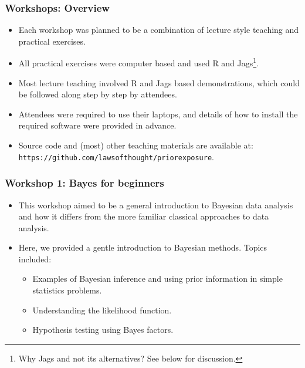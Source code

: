 \begin{frame}
	\frametitle{Workshops: Overview}

	\begin{itemize}
		\item Each workshop was planned to be a combination of lecture style teaching and practical exercises.
		\item All practical exercises were computer based and used R and Jags\footnote{Why Jags and not its alternatives? See below for discussion.}.
		\item Most lecture teaching involved R and Jags based demonstrations, which could be followed along step by step by attendees.
		\item Attendees were required to use their laptops, and details of how to install the required software were provided in advance.
		\item Source code and (most) other teaching materials are available at: \texttt{https://github.com/lawsofthought/priorexposure}.
	\end{itemize}

\end{frame}

\begin{frame}
	\frametitle{Workshop 1: Bayes for beginners}

	\begin{itemize}
		\item This workshop aimed to be a general introduction to Bayesian data analysis and how it differs from the more familiar classical approaches to data analysis.
		\item Here, we provided a gentle introduction to Bayesian methods. Topics included:
			\begin{itemize}
				\item Examples of Bayesian inference and using prior information in simple statistics problems.
				\item Understanding the likelihood function.
				\item Hypothesis testing using Bayes factors.
			\end{itemize}
	\end{itemize}

\end{frame}

